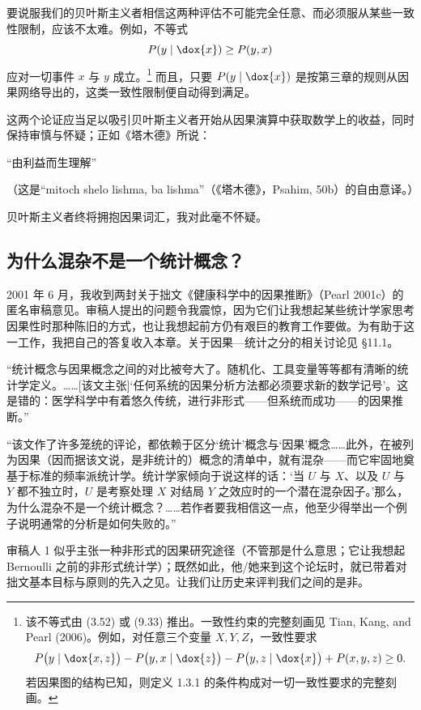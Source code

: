 要说服我们的贝叶斯主义者相信这两种评估不可能完全任意、而必须服从某些一致性限制，应该不太难。例如，不等式
\[
P(y\mid\dox{x})\ge P(y,x)
\]
应对一切事件 $x$ 与 $y$ 成立。\footnote{该不等式由 \textup{(3.52)} 或 \textup{(9.33)} 推出。一致性约束的完整刻画见 Tian, Kang, and Pearl (2006)。例如，对任意三个变量 $X,Y,Z$，一致性要求
\[
P\bigl(y\mid\dox{x,z}\bigr)-P\bigl(y,x\mid\dox{z}\bigr)-P\bigl(y,z\mid\dox{x}\bigr)+P(x,y,z)\ge 0.
\]
若因果图的结构已知，则定义 1.3.1 的条件构成对一切一致性要求的完整刻画。}
而且，只要 $P(y\mid\dox{x})$ 是按第三章的规则从因果网络导出的，这类一致性限制便自动得到满足。

这两个论证应当足以吸引贝叶斯主义者开始从因果演算中获取数学上的收益，同时保持审慎与怀疑；正如《塔木德》所说：

\begin{center}
\kaishu “由利益而生理解”
\end{center}

（这是“mitoch shelo lishma, ba lishma”（《塔木德》，Psahim, 50b）的自由意译。）

贝叶斯主义者终将拥抱因果词汇，我对此毫不怀疑。

\subsection{为什么混杂不是一个统计概念？}

2001 年 6 月，我收到两封关于拙文《健康科学中的因果推断》（Pearl 2001c）的匿名审稿意见。审稿人提出的问题令我震惊，因为它们让我想起某些统计学家思考因果性时那种陈旧的方式，也让我想起前方仍有艰巨的教育工作要做。为有助于这一工作，我把自己的答复收入本章。关于因果—统计之分的相关讨论见 \S11.1。


“统计概念与因果概念之间的对比被夸大了。随机化、工具变量等等都有清晰的统计学定义。……[该文主张]‘任何系统的因果分析方法都必须要求新的数学记号’。这是错的：医学科学中有着悠久传统，进行非形式——但系统而成功——的因果推断。”

“该文作了许多笼统的评论，都依赖于区分‘统计’概念与‘因果’概念……此外，在被列为因果（因而据该文说，是非统计的）概念的清单中，就有混杂——而它牢固地奠基于标准的频率派统计学。统计学家倾向于说这样的话：‘当 $U$ 与 $X$、以及 $U$ 与 $Y$ 都不独立时，$U$ 是考察处理 $X$ 对结局 $Y$ 之效应时的一个潜在混杂因子。’那么，为什么混杂不是一个统计概念？……若作者要我相信这一点，他至少得举出一个例子说明通常的分析是如何失败的。”


审稿人 1 似乎主张一种非形式的因果研究途径（不管那是什么意思；它让我想起 Bernoulli 之前的非形式统计学）；既然如此，他/她来到这个论坛时，就已带着对拙文基本目标与原则的先入之见。让我们让历史来评判我们之间的是非。

